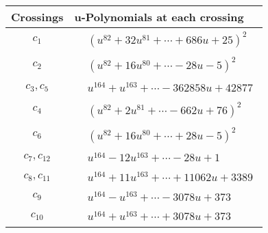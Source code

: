 \documentclass[1p]{elsarticle_modified}
\theoremstyle{definition}
\begin{document}
\begin{tabular}{m{50pt}|m{274pt}}
Crossings & \hspace{64pt}u-Polynomials at each crossing \\
\hline $$\begin{aligned}c_{1}\end{aligned}$$&$\begin{aligned}
&(u^{82}+32 u^{81}+\cdots+686 u+25)^{2}
\end{aligned}$\\
\hline $$\begin{aligned}c_{2}\end{aligned}$$&$\begin{aligned}
&(u^{82}+16 u^{80}+\cdots-28 u-5)^{2}
\end{aligned}$\\
\hline $$\begin{aligned}c_{3},c_{5}\end{aligned}$$&$\begin{aligned}
&u^{164}+u^{163}+\cdots-362858 u+42877
\end{aligned}$\\
\hline $$\begin{aligned}c_{4}\end{aligned}$$&$\begin{aligned}
&(u^{82}+2 u^{81}+\cdots-662 u+76)^{2}
\end{aligned}$\\
\hline $$\begin{aligned}c_{6}\end{aligned}$$&$\begin{aligned}
&(u^{82}+16 u^{80}+\cdots+28 u-5)^{2}
\end{aligned}$\\
\hline $$\begin{aligned}c_{7},c_{12}\end{aligned}$$&$\begin{aligned}
&u^{164}-12 u^{163}+\cdots-28 u+1
\end{aligned}$\\
\hline $$\begin{aligned}c_{8},c_{11}\end{aligned}$$&$\begin{aligned}
&u^{164}+11 u^{163}+\cdots+11062 u+3389
\end{aligned}$\\
\hline $$\begin{aligned}c_{9}\end{aligned}$$&$\begin{aligned}
&u^{164}- u^{163}+\cdots-3078 u+373
\end{aligned}$\\
\hline $$\begin{aligned}c_{10}\end{aligned}$$&$\begin{aligned}
&u^{164}+u^{163}+\cdots+3078 u+373
\end{aligned}$\\
\hline
\end{tabular}\\~\\
\end{document}
